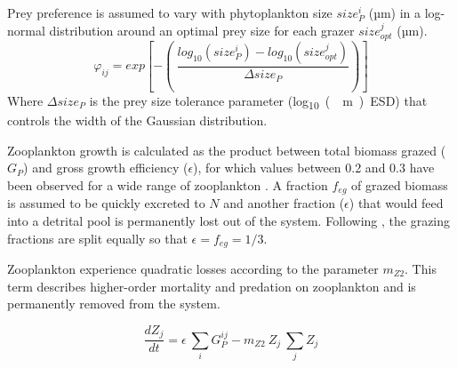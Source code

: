 \documentclass[journal abbreviation, manuscript]{copernicus}
\begin{document}
Prey preference is assumed to vary with phytoplankton size $size_{P}^i$ (\unit{µm}) in a log-normal distribution around an optimal prey size for each grazer $size_{opt}^j$ (\unit{µm}).
\begin{equation}
    \varphi_{ij} = exp \left[ -\left( \ \frac{ log_{10}(size_P^i) - log_{10}(size_{opt}^j) }{ \Delta size_{P} } \right) \right]
\end{equation}
Where $\Delta size_{P}$ is the prey size tolerance parameter (\unit{log_{10}(\mu m) ESD}) that controls the width of the Gaussian distribution.

Zooplankton growth is calculated as the product between total biomass grazed ($G_P$) and gross growth efficiency ($\epsilon$), for which values between 0.2 and 0.3 have been observed for a wide range of zooplankton \citep{Straile1997GrossGroup}. A fraction $f_{eg}$ of grazed biomass is assumed to be quickly excreted to $N$ and another fraction ($\epsilon$) that would feed into a detrital pool is permanently lost out of the system. Following \citet{Banas2011b}, the grazing fractions are split equally so that $\epsilon = f_{eg} = 1/3$.

Zooplankton experience quadratic losses according to the parameter $m_{Z2}$. This term describes higher-order mortality and predation on zooplankton and is permanently removed from the system.

\begin{equation}
    \label{Eq:BanasZoo}
    \frac{d Z_j}{d t} =
    \epsilon \ \sum_{i} G_P^{ij} %
    - m_{Z2} \ Z_j \ \sum_{j} Z_j  %
\end{equation}
\end{document}
